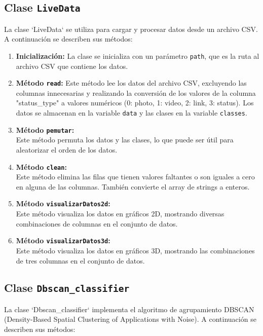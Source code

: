 \documentclass[conference]{IEEEtran}
\begin{document}
\subsection{Clase \texttt{LiveData}}
La clase `LiveData` se utiliza para cargar y procesar datos desde un archivo CSV. A continuación se describen sus métodos:

\begin{enumerate}
  \item \textbf{Inicialización:} 
  La clase se inicializa con un parámetro \texttt{path}, que es la ruta al archivo CSV que contiene los datos.

  \item \textbf{Método \texttt{read}:} 
  Este método lee los datos del archivo CSV, excluyendo las columnas innecesarias y realizando la conversión de los valores de la columna "status\_type" a valores numéricos (0: photo, 1: video, 2: link, 3: status). Los datos se almacenan en la variable \texttt{data} y las clases en la variable \texttt{classes}.

  \item \textbf{Método \texttt{pemutar}:} \\
  Este método permuta los datos y las clases, lo que puede ser útil para aleatorizar el orden de los datos.

  \item \textbf{Método \texttt{clean}:} \\
  Este método elimina las filas que tienen valores faltantes o son iguales a cero en alguna de las columnas. También convierte el array de strings a enteros.

  \item \textbf{Método \texttt{visualizarDatos2d}:} \\
  Este método visualiza los datos en gráficos 2D, mostrando diversas combinaciones de columnas en el conjunto de datos.

  \item \textbf{Método \texttt{visualizarDatos3d}:} \\
  Este método visualiza los datos en gráficos 3D, mostrando las combinaciones de tres columnas en el conjunto de datos.

\end{enumerate}

\subsection{Clase \texttt{Dbscan\_classifier}}
La clase `Dbscan\_classifier` implementa el algoritmo de agrupamiento DBSCAN (Density-Based Spatial Clustering of Applications with Noise). A continuación se describen sus métodos:
\end{document}
